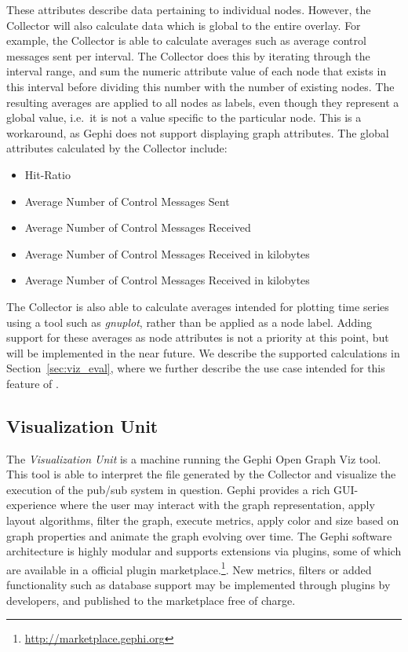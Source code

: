 These attributes describe data pertaining to individual nodes. However,
the Collector will also calculate data which is global to the entire
overlay. For example, the Collector is able to calculate averages such
as average control messages sent per interval. The Collector does this
by iterating through the interval range, and sum the numeric attribute
value of each node that exists in this interval before dividing this
number with the number of existing nodes. The resulting averages are
applied to all nodes as labels, even though they represent a global
value, i.e.\ it is not a value specific to the particular node. This is
a workaround, as Gephi does not support displaying graph attributes.
The global attributes calculated by the Collector include:

\begin{itemize}
    \item Hit-Ratio
    \item Average Number of Control Messages Sent
    \item Average Number of Control Messages Received
    \item Average Number of Control Messages Received in kilobytes
    \item Average Number of Control Messages Received in kilobytes
\end{itemize}

The Collector is also able to calculate averages intended for plotting
time series using a tool such as \emph{gnuplot}, rather than be applied as a
node label. Adding support for these averages as node attributes is not
a priority at this point, but will be implemented in the near future. We
describe the supported calculations in Section~\ref{sec:viz_eval}, where
we further describe the use case intended for this feature of \demo.

\subsection{Visualization Unit}
\label{sec:viz_unit}

The \emph{Visualization Unit} is a machine running the Gephi Open Graph
Viz tool. This tool is able to interpret the \gexf{} file generated by
the Collector and visualize the execution of the pub/sub system in
question. Gephi provides a rich GUI-experience where the user may
interact with the graph representation, apply layout algorithms, filter
the graph, execute metrics, apply color and size based on graph
properties and animate the graph evolving over time. The Gephi software
architecture is highly modular and supports extensions via plugins, some
of which are available in a official plugin
marketplace.\footnote{\url{http://marketplace.gephi.org}}. New metrics,
filters or added functionality such as database support may be
implemented through plugins by developers, and published to the
marketplace free of charge.

